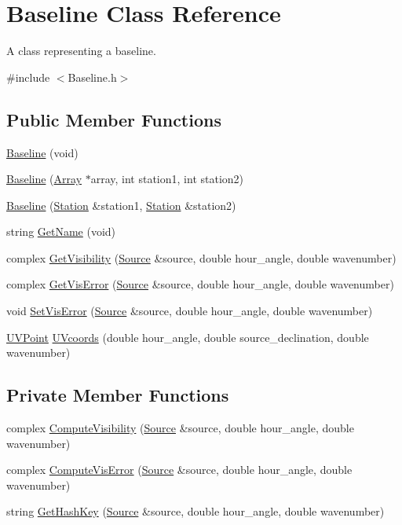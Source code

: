 \hypertarget{classBaseline}{
\section{Baseline Class Reference}
\label{classBaseline}
}


A class representing a baseline.  




{\ttfamily \#include $<$Baseline.h$>$}

\subsection*{Public Member Functions}
\begin{DoxyCompactItemize}
\item 
\hyperlink{classBaseline_afe029a1f3f85da82f45e19ab13f4a382}{Baseline} (void)
\item 
\hyperlink{classBaseline_a7aa78f64de16ef5469450348407612e9}{Baseline} (\hyperlink{classArray}{Array} $\ast$array, int station1, int station2)
\item 
\hyperlink{classBaseline_acb78f3f6c2020cc0c9cc923ddb6a2133}{Baseline} (\hyperlink{classStation}{Station} \&station1, \hyperlink{classStation}{Station} \&station2)
\item 
string \hyperlink{classBaseline_ad12e1939189ed6b413f9fb691eeb7ff0}{GetName} (void)
\item 
complex \hyperlink{classBaseline_a817d0c4e83714b68efcc7fb7fdac9a02}{GetVisibility} (\hyperlink{classSource}{Source} \&source, double hour\_\-angle, double wavenumber)
\item 
complex \hyperlink{classBaseline_ab21c506fd87b21f6562f09a1ba7ae77a}{GetVisError} (\hyperlink{classSource}{Source} \&source, double hour\_\-angle, double wavenumber)
\item 
void \hyperlink{classBaseline_a39f6121fa15d29d59e8b25e8850d2b0b}{SetVisError} (\hyperlink{classSource}{Source} \&source, double hour\_\-angle, double wavenumber)
\item 
\hyperlink{classUVPoint}{UVPoint} \hyperlink{classBaseline_a44fc7f5773b736303d344174ed4049b2}{UVcoords} (double hour\_\-angle, double source\_\-declination, double wavenumber)
\end{DoxyCompactItemize}
\subsection*{Private Member Functions}
\begin{DoxyCompactItemize}
\item 
complex \hyperlink{classBaseline_af5d2d827062aae6eaff5440c60d3d0b4}{ComputeVisibility} (\hyperlink{classSource}{Source} \&source, double hour\_\-angle, double wavenumber)
\item 
complex \hyperlink{classBaseline_ab5374e1c77d1da0cd8d13dfff39f5877}{ComputeVisError} (\hyperlink{classSource}{Source} \&source, double hour\_\-angle, double wavenumber)
\item 
string \hyperlink{classBaseline_a78f552de0293445a1e1a06a465f4aaf7}{GetHashKey} (\hyperlink{classSource}{Source} \&source, double hour\_\-angle, double wavenumber)
\end{DoxyCompactItemize}
